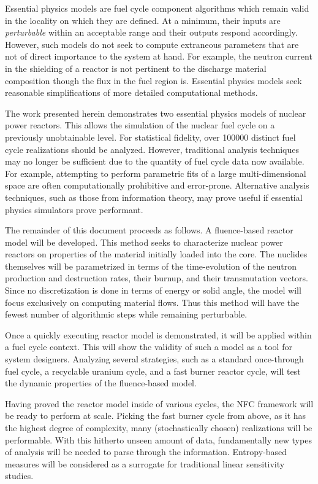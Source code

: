 Essential physics models are fuel cycle component algorithms which remain valid in the 
locality on which they are defined.  At a minimum, their inputs are \emph{perturbable} 
within an acceptable range and their outputs respond accordingly.  However, such 
models do not seek to compute extraneous parameters that are not of direct importance
to the system at hand.  For example, the neutron current in the shielding of a reactor
is not pertinent to the discharge material composition though the flux in the fuel region is.
Essential physics models seek reasonable simplifications of more detailed computational methods.

The work presented herein demonstrates two essential physics models of nuclear power reactors.
This allows the simulation of the nuclear fuel cycle on a previously unobtainable level.
For statistical fidelity, over 100000 distinct fuel cycle realizations should be analyzed.  
However, traditional analysis techniques may no longer be sufficient due to the quantity of fuel cycle data now 
available. For example, attempting to perform parametric fits of a large multi-dimensional 
space are often computationally prohibitive and error-prone.
Alternative analysis techniques, such as those from information theory, may prove useful
if essential physics simulators prove performant.

The remainder of this document proceeds as follows.  
A fluence-based reactor model will be developed.  This method seeks to characterize nuclear power
reactors on properties of the material initially loaded into the core.  The nuclides
themselves will be parametrized in terms of the time-evolution of the neutron production 
and destruction rates, their burnup, and their transmutation vectors.  Since no discretization
is done in terms of energy or solid angle, the model will focus exclusively on computing 
material flows.  Thus this method will have the fewest number of algorithmic steps while 
remaining perturbable. 

Once a quickly executing reactor model is demonstrated, it will be applied within a fuel
cycle context.  This will show the validity of such a model as a tool for system designers.
Analyzing several strategies, such as a standard once-through fuel cycle, a recyclable uranium
cycle, and a fast burner reactor cycle, will test the dynamic properties of the fluence-based
model.  

Having proved the reactor model inside of various cycles, the NFC framework will be ready to 
perform at scale.  Picking the fast burner cycle from above, as it has the highest degree of complexity, 
many (stochastically chosen) realizations will be performable.  With this hitherto unseen amount of data, 
fundamentally new types of analysis will be needed to parse through the information.  Entropy-based measures
will be considered as a surrogate for traditional linear sensitivity studies.


